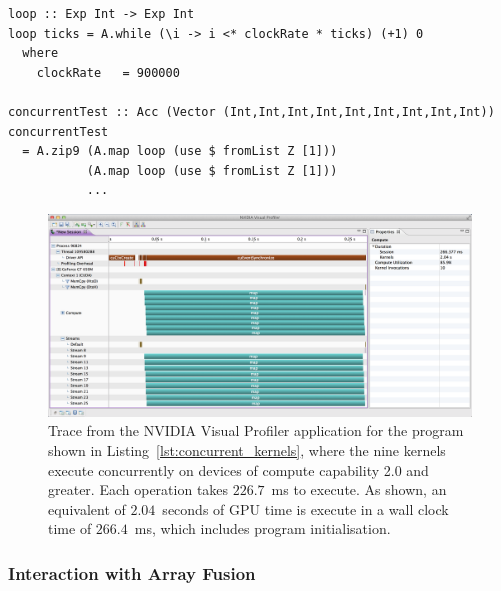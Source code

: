 \begin{lstlisting}[style=haskell_float
    ,float
    ,label=lst:concurrent_kernels
    ,caption={[Example program that executes kernels concurrently]
        An example program that executes each of the \code{map} kernels
        concurrently, on devices of compute capability 2.0 and greater. Note
        that in order to keep the example simple, the displayed behaviour is
        only seen when fusion is disabled, to prevent the operations from being
        combined into a singel kernel.}]
loop :: Exp Int -> Exp Int
loop ticks = A.while (\i -> i <* clockRate * ticks) (+1) 0
  where
    clockRate   = 900000

concurrentTest :: Acc (Vector (Int,Int,Int,Int,Int,Int,Int,Int,Int))
concurrentTest
  = A.zip9 (A.map loop (use $ fromList Z [1]))
           (A.map loop (use $ fromList Z [1]))
           ...
\end{lstlisting}

\begin{figure}[tbp]
    \centering
    \includegraphics[width=\textwidth]{images/sec-4/concurrent_kernels}
    \caption[Profiling trace of a program which executes kernels
    concurrently]{Trace from the NVIDIA Visual Profiler application for the
    program shown in Listing~\ref{lst:concurrent_kernels}, where the nine
     kernels execute concurrently on devices of compute capability 2.0
    and greater. Each  operation takes $226.7$~ms to execute. As
    shown, an equivalent of $2.04$~seconds of GPU time is execute in a wall
    clock time of $266.4$~ms, which includes program initialisation.}
    \label{fig:concurrent_kernels}
\end{figure}

\subsubsection{Interaction with Array Fusion}

